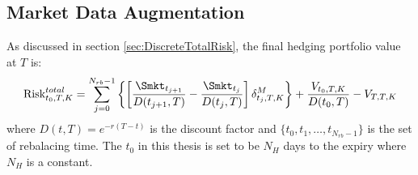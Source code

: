 \subsection{Market Data Augmentation}
\label{sec:DataAugmentation}
As discussed in section \ref{sec:DiscreteTotalRisk}, the final hedging portfolio value at $T$ is:
\begin{equation}
   \text{Risk}^{total}_{t_0,T,K}=\sum_{j=0}^{N_{rb}-1}\left\{ \left[\frac{\Smkt_{t_{j+1}}}{D(t_{j+1},T)}-\frac{\Smkt_{t_{j}}}{D(t_{j},T)}\right] \delta^M_{t_j,T,K} \right\}+\frac{V_{t_0,T,K}}{D(t_{0},T)}-V_{T,T,K}
\end{equation}
where
$D(t,T)=e^{-r(T-t)}$ is the discount factor and $\{t_0,t_1, \dots, t_{N_{rb}-1}\}$ is the set of rebalacing time. The $t_0$ in this thesis is set to be $N_H$ days to the expiry where $N_H$  is a constant. 

